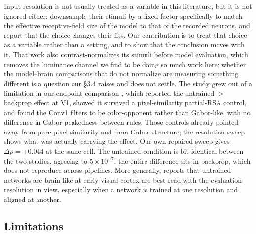 \documentclass[10pt,twocolumn]{article}
\begin{document}
Input resolution is not usually treated as a variable in this literature, but it is not ignored either: \citet{laskar2018} downsample their stimuli by a fixed factor specifically to match the effective receptive-field size of the model to that of the recorded neurons, and report that the choice changes their fits. Our contribution is to treat that choice as a variable rather than a setting, and to show that the conclusion moves with it. That work also contrast-normalizes its stimuli before model evaluation, which removes the luminance channel we find to be doing so much work here; whether the model--brain comparisons that do not normalize are measuring something different is a question our \S3.4 raises and does not settle. The study grew out of a limitation in our endpoint comparison \citep{leutenegger2026}, which reported the untrained $>$ backprop effect at V1, showed it survived a pixel-similarity partial-RSA control, and found the Conv1 filters to be color-opponent rather than Gabor-like, with no difference in Gabor-peakedness between rules. Those controls already pointed away from pure pixel similarity and from Gabor structure; the resolution sweep shows what was actually carrying the effect. Our own repaired sweep gives $\Delta\rho = +0.044$ at the same cell. The untrained condition is bit-identical between the two studies, agreeing to $5\times10^{-7}$; the entire difference sits in backprop, which does not reproduce across pipelines. More generally, reports that untrained networks are brain-like at early visual cortex \citep{saxe2011,truzzi2025} are best read with the evaluation resolution in view, especially when a network is trained at one resolution and aligned at another.

\subsection{Limitations}
\end{document}
